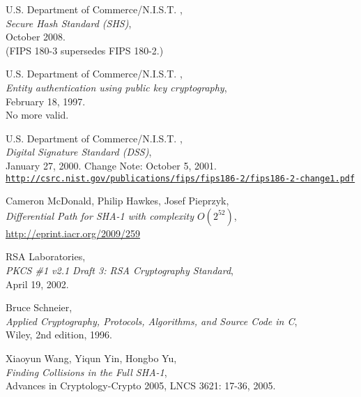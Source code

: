 \newpage
\begin{thebibliography}{99999}

 U.S. Department of Commerce/N.I.S.T. ,
     \\
    {\em Secure Hash Standard (SHS)}, \\
    October 2008.\\
    (FIPS 180-3 supersedes FIPS 180-2.)

 U.S. Department of Commerce/N.I.S.T. ,
     \\
    {\em Entity authentication using public key cryptography}, \\
    February 18, 1997.\\
    No more valid.
    
 U.S. Department of Commerce/N.I.S.T. ,
     \\
    {\em Digital Signature Standard (DSS)}, \\
    January 27, 2000. Change Note: October 5, 2001.\\
  \href{http://csrc.nist.gov/publications/fips/fips186-2/fips186-2-change1.pdf}
   {\tt http://csrc.nist.gov/publications/fips/fips186-2/fips186-2-change1.pdf}

 Cameron McDonald, Philip Hawkes, Josef Pieprzyk, 
     \\
    {\em Differential Path for SHA-1 with complexity $O(2^{52})$}, \\
    \url{http://eprint.iacr.org/2009/259}

 RSA Laboratories,
      \\
    {\em PKCS \#1 v2.1 Draft 3: RSA Cryptography Standard}, \\
    April 19, 2002.

  
    Bruce Schneier, \\
    {\em Applied Cryptography, Protocols, Algorithms, and Source Code in C}, \\
    Wiley, 2nd edition, 1996.

 Xiaoyun Wang, Yiqun Yin, Hongbo Yu, 
     \\
    {\em Finding Collisions in the Full SHA-1}, \\
    Advances in Cryptology-Crypto 2005, LNCS 3621: 17-36, 2005.


\end{thebibliography}
